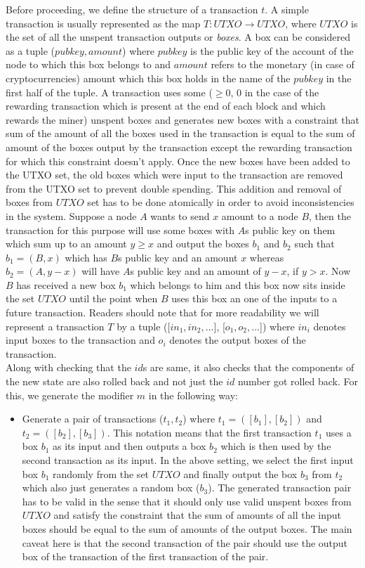 \begin{enumerate}[\IEEEsetlabelwidth{Z}]
\begin{itemize}[]
Before proceeding, we define the structure of a transaction $t$. A simple transaction is usually represented as the map $T : UTXO \to UTXO$, where $UTXO$ is the set of all the unspent transaction outputs or \textit{boxes}. A box can be considered as a tuple ($pubkey, amount$) where $pubkey$ is the public key of the account of the node to which this box belongs to and $amount$ refers to the monetary (in case of cryptocurrencies) amount which this box holds in the name of the $pubkey$ in the first half of the tuple. A transaction uses some ($\geq 0$, 0 in the case of the rewarding transaction which is present at the end of each block and which rewards the miner) unspent boxes and generates new boxes with a constraint that sum of the amount of all the boxes used in the transaction is equal to the sum of amount of the boxes output by the transaction except the rewarding transaction for which this constraint doesn't apply. Once the new boxes have been added to the UTXO set, the old boxes which were input to the transaction are removed from the UTXO set to prevent double spending. This addition and removal of boxes from $UTXO$ set has to be done atomically in order to avoid inconsistencies in the system. Suppose a node $A$ wants to send $x$ amount to a node $B$, then the transaction for this purpose will use some boxes with $A$s public key on them which sum up to an amount $y \geq x$ and output the boxes $b_1$ and $b_2$ such that $b_1 = (B, x)$ which has $B$s public key and an amount $x$ whereas $b_2 = (A, y-x)$ will have $A$s public key and an amount of $y-x$, if $y>x$. Now $B$ has received a new box $b_1$ which belongs to him and this box now sits inside the set $UTXO$ until the point when $B$ uses this box an one of the inputs to a future transaction. Readers should note that for more readability we will represent a transaction $T$ by a tuple ([$in_1, in_2, ...$], [$o_1, o_2, ...$]) where $in_i$ denotes input boxes to the transaction and $o_i$ denotes the output boxes of the transaction.\\
Along with checking that the $id$s are same, it also checks that the components of the new state are also rolled back and not just the $id$ number got rolled back. For this, we generate the modifier $m$ in the following way:
\begin{itemize}
\item Generate a pair of transactions ($t_1, t_2$) where $t_1 = ([b_{1}], [b_{2}])$ and $t_2 = ([b_{2}], [b_{3}])$. This notation means that the first transaction $t_1$ uses a box $b_1$ as its input and then outputs a box $b_2$ which is then used by the second transaction as its input. In the above setting, we select the first input box $b_1$ randomly from the set $UTXO$ and finally output the box $b_3$ from $t_2$ which also just generates a random box ($b_3$). The generated transaction pair has to be valid in the sense that it should only use valid unspent boxes from $UTXO$ and satisfy the constraint that the sum of amounts of all the input boxes should be equal to the sum of amounts of the output boxes. The main caveat here is that the second transaction of the pair should use the output box of the transaction of the first transaction of the pair.

\end{itemize}
\end{itemize}
\end{enumerate}
